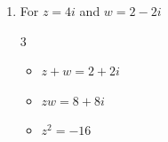 \documentclass{ximera}
\begin{document}
\begin{enumerate}
\begin{multicols}{3}
\begin{itemize}
\item $z+w = -1+3i$

\item $zw = -2-i$

\item $z^2 = -1$

\end{itemize}

\end{multicols}

\begin{multicols}{3}

\begin{itemize}

\item $\frac{1}{z} = -i$

\item $\frac{z}{w} = \frac{2}{5} - \frac{1}{5} \, i$

\item $\frac{w}{z} = 2+i$

\end{itemize}

\end{multicols}

\begin{multicols}{3}

\begin{itemize}

\item $\overline{z} = -i$

\item $z\overline{z} = 1$

\item $(\overline{z})^2 = -1$

\end{itemize}

\end{multicols}

\item  For  $z = 4i$ and $w = 2-2i$

\begin{multicols}{3}

\begin{itemize}

\item $z+w = 2+2i$

\item $zw = 8+8i$

\item $z^2 = -16$

\end{itemize}


\end{multicols}
\end{enumerate}
\end{document}
